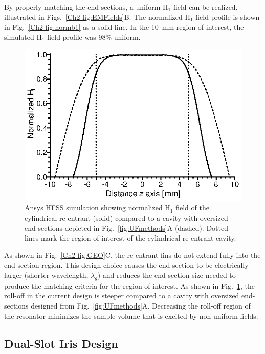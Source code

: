 By properly matching the end sections, a uniform H$_1$ field can be realized, illustrated in Figs.~\ref{Ch2-fig:EMFields}B. The normalized H$_1$ field profile is shown in Fig.~\ref{Ch2-fig:normb1} as a solid line. In the 10~mm region-of-interest, the simulated H$_1$ field profile was 98\% uniform. 

\begin{figure}[htb]\centering
 \includegraphics{Kapitel/Ch2-Images/ComparisonOfEndSections.eps}
 \caption[Ansys HFSS simulation comparing oversized and re-entrant end sections.]{Ansys HFSS simulation showing normalized H$_1$ field of the cylindrical re-entrant \cylTE{} (solid) compared to a \cylTE{} cavity with oversized end-sections depicted in Fig.~\ref{fig:UFmethods}A (dashed). Dotted lines mark the region-of-interest of the cylindrical re-entrant \cylTE{} cavity. }
 \label{Ch2-fig:normb1compare}
\end{figure}

As shown in Fig.~\ref{Ch2-fig:GEO}C, the re-entrant fins do not extend fully into the end section region. This design choice causes the end section to be electrically larger (shorter wavelength, $\lambda_g$) and reduces the end-section size needed to produce the matching criteria for the region-of-interest. As shown in Fig.~\ref{Ch2-fig:normb1compare}, the roll-off in the current design is steeper compared to a \cylTE{} cavity with oversized end-sections designed from Fig.~\ref{fig:UFmethods}A. Decreasing the roll-off region of the resonator minimizes the sample volume that is excited by non-uniform fields.

\subsection{Dual-Slot Iris Design}

